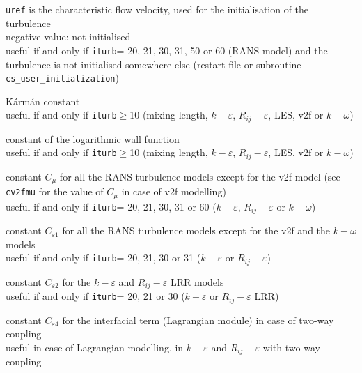 {{\tt uref} is the characteristic flow velocity,
used for the initialisation of the turbulence\\
negative value: not initialised\\
useful if and only if {\tt iturb}= 20, 21, 30, 31, 50 or 60 (RANS model)
and the turbulence is not initialised somewhere
else (restart file or subroutine \texttt{cs\_user\_initialization})}



{K\'arm\'an constant\\
useful if and only if {\tt iturb}$\geqslant$10
(mixing length, $k-\varepsilon$, $R_{ij}-\varepsilon$, LES, v2f or $k-\omega$)}

{constant of the logarithmic wall function\\
useful if and only if {\tt iturb}$\geqslant$10
(mixing length, $k-\varepsilon$, $R_{ij}-\varepsilon$, LES, v2f or $k-\omega$)}

{constant $C_\mu$ for all the RANS turbulence models except for the v2f model
(see {\tt cv2fmu} for the value of $C_\mu$ in case of v2f modelling)\\
useful if and only if {\tt iturb}= 20,
21, 30, 31 or 60 ($k-\varepsilon$, $R_{ij}-\varepsilon$ or $k-\omega$)}

{constant $C_{\varepsilon 1}$ for all the RANS turbulence models except
for the v2f and the $k-\omega$ models\\
useful if and only if {\tt iturb}= 20,
21, 30 or 31 ($k-\varepsilon$ or $R_{ij}-\varepsilon$)}

{constant $C_{\varepsilon 2}$ for the $k-\varepsilon$ and
$R_{ij}-\varepsilon$ LRR models\\
useful if and only if {\tt iturb}= 20, 21 or 30
($k-\varepsilon$ or $R_{ij}-\varepsilon$ LRR)}


{constant $C_{\varepsilon 4}$ for the interfacial term (Lagrangian module) in
case of two-way coupling\\
useful in case of Lagrangian modelling, in $k-\varepsilon$ and $R_{ij}-\varepsilon$
with two-way coupling}

